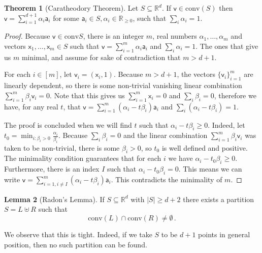 \documentclass[12pt]{amsart}
\theoremstyle{definition}
\newtheorem{thm}{Theorem}[section]
\newtheorem{lm}[thm]{Lemma}
\newcommand{\R}{\mathbb{R}}
\newcommand{\vv}{\mathsf{v}}
\newcommand{\vx}{\mathsf{x}}
\newcommand{\va}{\mathsf{a}}
\newcommand{\conv}{\mathrm{conv}}
\begin{document}
\begin{thm}[Caratheodory Theorem]
Let $S \subseteq \R^d$.
If $\vv \in \conv (S)$ then $\vv = \sum_{i=1}^{d+1} \alpha_i \va_i$ for some $\va_i \in S, \alpha_i \in \R_{\geq 0}$, such that $\sum_i \alpha_i = 1$.
\end{thm}

\begin{proof}
Because $\vv \in \conv S$, there is an integer $m$, real numbers $\alpha_1, \ldots, \alpha_m $ and vectors $\vx_1, \ldots, \vx_m \in S $ such that $\vv = \sum_{i=1}^{m} \alpha_i \va_i$ and $\sum_i \alpha_i = 1$.
The ones that give us $m$ minimal, and assume for sake of contradiction that $m > d+1$.

For each $i \in [m]$, let $\vv_{i} = (\vx_i , 1)$.
Because $m > d+1$, the vectors $\{ \vv_i \}_{i=1}^m$ are linearly dependent, so there is some non-trivial vanishing linear combination $\sum_{i=1}^m \beta_i \vv_i = 0$.
Note that this gives us $\sum_{i=1}^m \vx_i = 0 $ and $\sum_i \beta_i = 0$, therefore we have, for any real $t$, that $\vv = \sum_{i=1}^{m} (\alpha_i - t \beta_i) \va_i$ and $\sum_i ( \alpha_i  - t \beta_i ) = 1$.

The proof is concluded when we will find $t$ such that $\alpha_i - t \beta_i \geq 0$.
Indeed, let $t_0 = \min_{i : \beta_i > 0} \frac{\alpha_i}{\beta_i}$.
Because $\sum_i \beta_i = 0$ and the linear combination $\sum_{i=1}^m \beta_i \vv_i$ was taken to be non-trivial, there is some $\beta_i > 0$, so $t_0 $ is well defined and positive.
The minimality condition guarantees that for each $i$ we have $\alpha_i - t_0 \beta_i \geq 0$.
Furthermore, there is an index $I$ such that $\alpha_i - t_0 \beta_i = 0$.
This means we can write $\vv = \sum_{i=1, i \neq I}^{m} (\alpha_i - t \beta_i) \va_i$.
This contradicts the minimality of $m$.
\end{proof}



\begin{lm}[Radon's Lemma]\label{lm:radon}
If $S\subseteq \R^d$ with $|S| \geq d+2$ there exists a partition $S = L \uplus R$ such that $$\conv (L) \cap \conv (R) \neq \emptyset \, .$$
\end{lm}

We observe that this is tight.
Indeed, if we take $S$ to be $d+1$ points in general position, then no such partition can be found.
\end{document}
